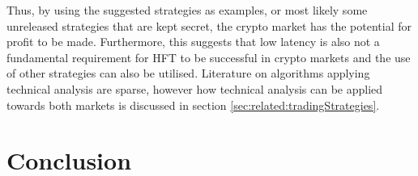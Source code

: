 Thus, by using the suggested strategies as examples, or most likely some unreleased strategies that are kept secret, the crypto market has the potential for profit to be made. Furthermore, this suggests that low latency is also not a fundamental requirement for HFT to be successful in crypto markets and the use of other strategies can also be utilised. Literature on algorithms applying technical analysis are sparse, however how technical analysis can be applied towards both markets is discussed in section \ref{sec:related:tradingStrategies}.


\section{Conclusion}
\label{sec:related:conclusion}

